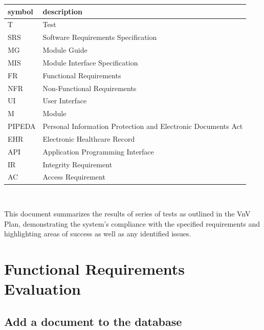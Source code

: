 \documentclass[12pt, titlepage]{article}
\begin{document}
\renewcommand{\arraystretch}{1.2}
\begin{tabular}{l l} 
  \toprule		
  \textbf{symbol} & \textbf{description}\\
  \midrule 
  T & Test\\
  SRS & Software Requirements Specification\\
  MG & Module Guide\\
  MIS & Module Interface Specification\\
  FR & Functional Requirements\\
  NFR & Non-Functional Requirements\\
  UI & User Interface\\
  M & Module \\
  PIPEDA & Personal Information Protection and Electronic Documents Act\\
  EHR & Electronic Healthcare Record\\
  API & Application Programming Interface \\
  IR & Integrity Requirement\\
  AC & Access Requirement\\
  \bottomrule
\end{tabular}\\


\newpage

\tableofcontents

\listoftables 

\listoffigures

\newpage


This document summarizes the results of series of tests as outlined in the VnV Plan, demonstrating the system's compliance with the specified requirements and highlighting areas of success as well as any identified issues. \\

\section{Functional Requirements Evaluation} \label{section:3} 

\subsection{Add a document to the database} \label{section:3.1}
\end{document}
